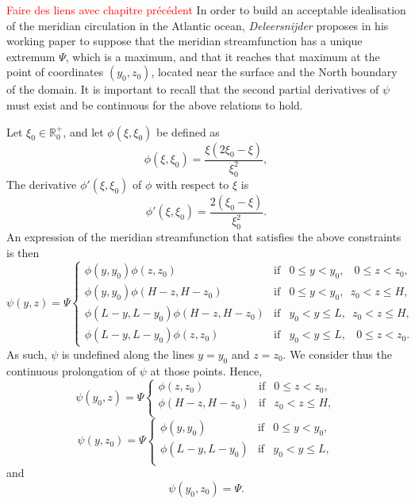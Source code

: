 \textcolor{red}{Faire des liens avec chapitre précédent} In order to build an acceptable idealisation of the meridian circulation in the Atlantic ocean, \textit{Deleersnijder} proposes in his working paper \cite{deleersnijder2006overturner} to suppose that the meridian streamfunction has a unique extremum $\Psi$, which is a maximum, and that it reaches that maximum at the point of coordinates $(y_0,z_0)$, located near the surface and the North boundary of the domain. It is important to recall that the second partial derivatives of $\psi$ must exist and be continuous for the above relations to hold.

Let $\xi_0 \in \mathbb{R}_0^+$, and let $\phi(\xi,\xi_0)$ be defined as
\begin{equation} \label{eq:phi}
	\phi(\xi,\xi_0) = \frac{\xi(2\xi_0-\xi)}{\xi_0^2},
\end{equation}
The derivative $\phi'(\xi,\xi_0)$ of $\phi$ with respect to $\xi$ is
\begin{equation}
	\phi'(\xi,\xi_0) = \frac{2(\xi_0-\xi)}{\xi_0^2}.
\end{equation}
An expression of the meridian streamfunction that satisfies the above constraints is then
\begin{equation} \label{eq:psi_overturner}
	\psi(y,z) = \Psi\left\{ 
		\begin{array}{lrr}
			\phi(y,y_0)\phi(z,z_0) & \mbox{if} & 0 \le y < y_0, \phantom{z_0}0 \le z < z_0,\\
			\phi(y,y_0)\phi(H-z,H-z_0) & \mbox{if} & 0 \le y < y_0, \phantom{0}z_0 < z \le H,\\
			\phi(L-y,L-y_0)\phi(H-z,H-z_0) & \mbox{if} & y_0 < y \le L, \phantom{0}z_0 < z \le H,\\
			\phi(L-y,L-y_0)\phi(z,z_0) & \mbox{if} & y_0 < y \le L, \phantom{z_0}0 \le z < z_0.
		\end{array}
	\right.
\end{equation}
As such, $\psi$ is undefined along the lines $y = y_0$ and $z = z_0$. We consider thus the continuous prolongation of $\psi$ at those points. Hence, 
\begin{equation} \label{eq:psi_y0}
	\psi(y_0,z) = \Psi\left\{ 
		\begin{array}{lrr}
			\phi(z,z_0) & \mbox{if} & 0 \le z < z_0,\\
			\phi(H-z,H-z_0) & \mbox{if} & z_0 < z \le H,\\
		\end{array}
	\right.
\end{equation}
\begin{equation} \label{eq:psi_z0}
	\psi(y,z_0) = \Psi\left\{ 
		\begin{array}{lrr}
			\phi(y,y_0) & \mbox{if} & 0 \le y < y_0,\\
			\phi(L-y,L-y_0) & \mbox{if} & y_0 < y \le L,\\
		\end{array}
	\right.
\end{equation}
and
\begin{equation}
	\psi(y_0,z_0) = \Psi.
\end{equation}


